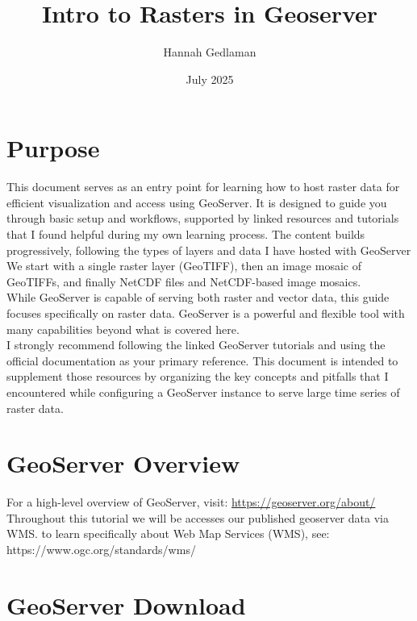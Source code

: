 \documentclass{article}
\title{Intro to Rasters in Geoserver}
\author{Hannah Gedlaman}
\date{July 2025}
\begin{document}
\maketitle

\section{Purpose}

This document serves as an entry point for learning how to host raster data for efficient visualization and access using GeoServer. It is designed to guide you through basic setup and workflows, supported by linked resources and tutorials that I found helpful during my own learning process. The content builds progressively, following the types of layers and data I have hosted with GeoServer We start with a single raster layer (GeoTIFF), then an image mosaic of GeoTIFFs, and finally NetCDF files and NetCDF-based image mosaics. \\



While GeoServer is capable of serving both raster and vector data, this guide focuses specifically on raster data. GeoServer is a powerful and flexible tool with many capabilities beyond what is covered here. \\

I strongly recommend following the linked GeoServer tutorials and using the official documentation as your primary reference. This document is intended to supplement those resources by organizing the key concepts and pitfalls that I encountered while configuring a GeoServer instance to serve large time series of raster data.

\section{GeoServer Overview}

For a high-level overview of  GeoServer, visit:  
\url{https://geoserver.org/about/} \\

\noindent Throughout this tutorial we will be accesses our published geoserver data via WMS. to learn specifically about Web Map Services (WMS), see:  
https://www.ogc.org/standards/wms/




\section{GeoServer Download}
\end{document}
